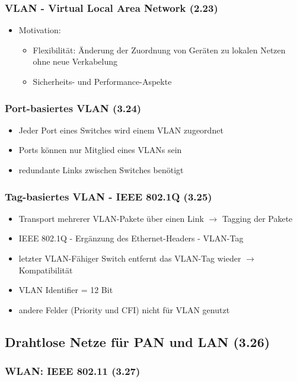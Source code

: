 \subsubsection{VLAN - Virtual Local Area Network (2.23)}
\begin{itemize}
	\item Motivation:
	\begin{itemize}
		\item Flexibilität: Änderung der Zuordnung von Geräten zu lokalen Netzen ohne neue Verkabelung
		\item Sicherheits- und Performance-Aspekte
	\end{itemize}
\end{itemize}
\subsubsection{Port-basiertes VLAN (3.24)}
\begin{itemize}
	\item Jeder Port eines Switches wird einem VLAN zugeordnet
	\item Ports können nur Mitglied eines VLANs sein
	\item redundante Links zwischen Switches benötigt
\end{itemize}
\subsubsection{Tag-basiertes VLAN - IEEE 802.1Q (3.25)}
\begin{itemize}
	\item Transport mehrerer VLAN-Pakete über einen Link \(\to\) Tagging der Pakete
	\item IEEE 802.1Q - Ergänzung des Ethernet-Headers - VLAN-Tag
	\item letzter VLAN-Fähiger Switch entfernt das VLAN-Tag wieder \(\to\) Kompatibilität
	\item VLAN Identifier = 12 Bit
	\item andere Felder (Priority und CFI) nicht für VLAN genutzt
\end{itemize}
\subsection{Drahtlose Netze für PAN und LAN (3.26)}
\subsubsection{WLAN: IEEE 802.11 (3.27)}
